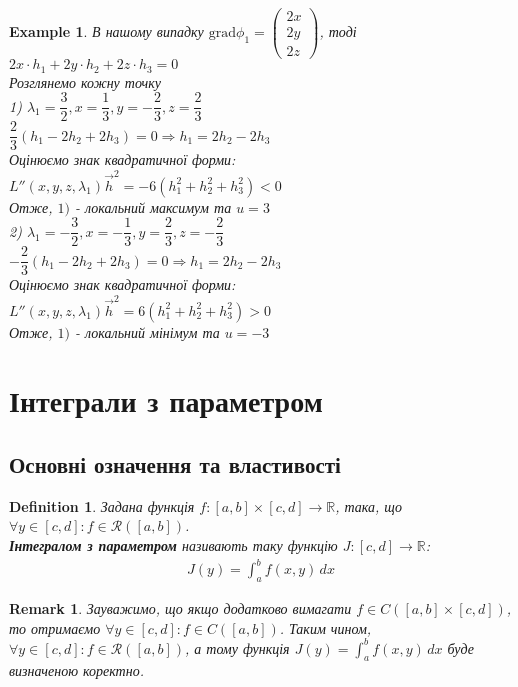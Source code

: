 \documentclass[a4paper, 10pt]{article}
\def\bigline{\vspace{5mm}\\}
\theoremstyle{theoremdd}
\theoremstyle{theoremdd}
\theoremstyle{theoremdd}
\newtheorem{definition}[theorem]{Definition}
\theoremstyle{theoremdd}
\theoremstyle{theoremdd}
\newtheorem{example}[theorem]{Example}
\theoremstyle{theoremdd}
\theoremstyle{theoremdd}
\newtheorem{remark}[theorem]{Remark}
\theoremstyle{theoremdd}
\theoremstyle{theoremdd}
\begin{document}
\begin{example}
В нашому випадку $\textrm{grad} \phi_1 = \begin{pmatrix}
2x \\ 2y \\ 2z
\end{pmatrix}$, тоді\\
$2x \cdot h_1 + 2y \cdot h_2 + 2z \cdot h_3 = 0$\\
Розглянемо кожну точку\\
1) $\lambda_1 = \dfrac{3}{2}, x = \dfrac{1}{3}, y = -\dfrac{2}{3}, z = \dfrac{2}{3}$\\
$\dfrac{2}{3} \left(h_1 - 2h_2 + 2h_3 \right) = 0 \Rightarrow h_1 = 2h_2 - 2h_3$\\
Оцінюємо знак квадратичної форми:\\
$L''(x,y,z,\lambda_1) \vec{h}^2 = -6(h_1^2+h_2^2+h_3^2) < 0$\\
Отже, $1)$ - локальний максимум та $u = 3$
\bigline
2) $\lambda_1 = -\dfrac{3}{2}, x = -\dfrac{1}{3}, y = \dfrac{2}{3}, z = -\dfrac{2}{3}$\\
$-\dfrac{2}{3} \left(h_1 - 2h_2 + 2h_3 \right) = 0 \Rightarrow h_1 = 2h_2 - 2h_3$\\
Оцінюємо знак квадратичної форми:\\
$L''(x,y,z,\lambda_1) \vec{h}^2 = 6(h_1^2+h_2^2+h_3^2) > 0$\\
Отже, $1)$ - локальний мінімум та $u = -3$
\end{example}
\fi
\newpage

\iffalse
\section{Інтеграли з параметром}
\subsection{Основні означення та властивості}
\begin{definition}
Задана функція $f \colon [a,b] \times [c,d] \to \mathbb{R}$, така, що $\forall y \in [c,d]: f \in \mathcal{R}([a,b])$.\\
\textbf{Інтегралом з параметром} називають таку функцію $J \colon [c,d] \to \mathbb{R}$:
\begin{align*}
J(y) = \int_a^b f(x,y)\,dx
\end{align*}
\end{definition}

\begin{remark}
Зауважимо, що якщо додатково вимагати $f \in C([a,b] \times [c,d])$, то отримаємо $\forall y \in [c,d]: f \in C([a,b])$. Таким чином, $\forall y \in [c,d]: f \in \mathcal{R}([a,b])$, а тому функція $J(y) = \displaystyle\int_a^b f(x,y)\,dx$ буде визначеною коректно.
\end{remark}
\end{document}

